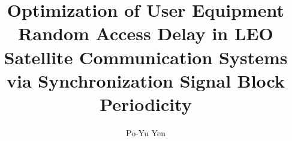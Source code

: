 \documentclass[12pt,oneandahalfspaced, a4paper]{tonic-thesis}
\title{Optimization of User Equipment Random Access Delay in LEO Satellite Communication Systems via Synchronization Signal Block Periodicity}
\author{Po-Yu Yen}
\numberwithin{equation}{chapter} %
\begin{document}
\begin{preliminary}

\begin{abstract}

\end{abstract}

\contents

\end{preliminary}










\begin{postliminary}




\end{postliminary}
\end{document}
